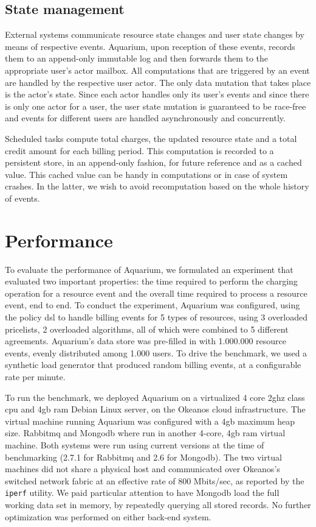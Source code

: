 \documentclass[letterpaper,twocolumn,10pt]{article}
\begin{document}
\subsection{State management}

External systems communicate resource state changes and user state
changes by means of respective events. Aquarium, upon reception of
these events, records them to an append-only immutable log and then
forwards them to the appropriate user's actor mailbox. All
computations that are triggered by an event are handled by the
respective user actor. The only data mutation that takes place is the
actor's state. Since each actor handles only its user's events and
since there is only one actor for a user, the user state mutation is
guaranteed to be race-free and events for different users are handled
asynchronously and concurrently.

Scheduled tasks compute total charges, the updated resource state and
a total credit amount for each billing period. This computation is
recorded to a persistent store, in an append-only fashion, for future
reference and as a cached value. This cached value can be handy in
computations or in case of system crashes. In the latter, we wish to
avoid recomputation based on the whole history of events.

\section{Performance}

To evaluate the performance of Aquarium, we formulated an experiment
that evaluated two important properties: the time required to perform
the charging operation for a resource event and the overall time
required to process a resource event, end to end. To conduct the
experiment, Aquarium was configured, using the policy {\sc dsl} to
handle billing events for 5 types of resources, using 3 overloaded
pricelists, 2 overloaded algorithms, all of which were combined to 5
different agreements. Aquarium's data store was pre-filled in with
1.000.000 resource events, evenly distributed among 1.000 users. To
drive the benchmark, we used a synthetic load generator that produced
random billing events, at a configurable rate per minute.

To run the benchmark, we deployed Aquarium on a virtualized 4 core
2{\sc gh}z class {\sc cpu} and 4{\sc gb} {\sc ram} Debian Linux
server, on the Okeanos cloud infrastructure. The virtual machine
running Aquarium was configured with a 4{\sc gb} maximum heap size.
Rabbit{\sc mq} and Mongo{\sc db} where run in another 4-core, 4{\sc gb
  ram} virtual machine. Both systems were run using current versions
at the time of benchmarking (2.7.1 for Rabbit{\sc mq} and 2.6 for
Mongo{\sc db}). The two virtual machines did not share a physical host
and communicated over Okeanos's switched network fabric at an
effective rate of 800 Mbits/sec, as reported by the \texttt{iperf}
utility. We paid particular attention to have Mongo{\sc db} load the
full working data set in memory, by repeatedly querying all stored
records. No further optimization was performed on either back-end
system.
\end{document}

